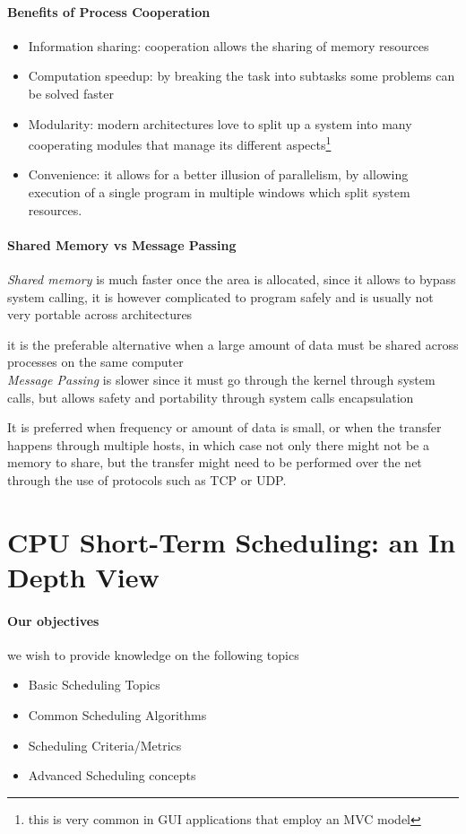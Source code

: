 \documentclass[openright, twoside]{report}
\theoremstyle{definition}
\theoremstyle{example}
\begin{document}
			\paragraph{Benefits of Process Cooperation}
				\begin{itemize}
					\item Information sharing: cooperation allows the sharing of memory resources 
					\item Computation speedup: by breaking the task into subtasks some problems can be solved faster
					\item Modularity: modern architectures love to split up a system into many cooperating modules that 
					manage its different aspects\footnote{this is very common in GUI applications that employ an MVC model}
					\item Convenience: it allows for a better illusion of parallelism, by allowing execution of a single program 
					in multiple windows which split system resources. 
 				\end{itemize}

			\paragraph{Shared Memory vs Message Passing}
				\emph{Shared memory} is much faster once the area is allocated, since it allows to bypass system calling,
				it is however complicated to program safely and is usually not very portable across architectures

				it is the preferable alternative when a large amount of data must be shared across processes on
				the same computer \\

				\emph{Message Passing} is slower since it must go through the kernel through system calls, but 
				allows safety and portability through system calls encapsulation

				It is preferred when frequency or amount of data is small, or when the transfer happens through
				multiple hosts, in which case not only there might not be a memory to share, but the transfer 
				might need to be performed over the net through the use of protocols such as 
				TCP or UDP.

	\section{CPU Short-Term Scheduling: an In Depth View}
			\paragraph{Our objectives}
			we wish to provide knowledge on the following topics
			\begin{itemize}
				\item Basic Scheduling Topics
				\item Common Scheduling Algorithms
				\item Scheduling Criteria/Metrics
				\item Advanced Scheduling concepts
			\end{itemize}
\end{document}
